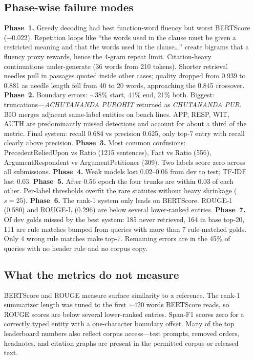 \documentclass[11pt, oneside]{article}
\begin{document}
\subsection{Phase-wise failure modes}
\textbf{Phase~1.} Greedy decoding had best function-word fluency but worst BERTScore ($-0.022$).
Repetition loops like ``the words used in the clause must be given a restricted meaning and that the
words used in the clause\ldots'' create bigrams that a fluency proxy rewards, hence the 4-gram repeat
limit. Citation-heavy continuations under-generate (36 words from 210 tokens). Shorter retrieval needles
pull in passages quoted inside other cases; quality dropped from 0.939 to 0.881 as needle length fell
from 40 to 20 words, approaching the 0.845 crossover.
\textbf{Phase~2.} Boundary errors: $\sim$38\% start, 41\% end, 21\% both. Biggest: truncations---\emph{ACHUTANANDA
PUROHIT} returned as \emph{CHUTANANDA PUR}. BIO merges adjacent same-label entities on bench lines. APP,
RESP, WIT, AUTH are predominantly missed detections and account for about a third of the metric. Final
system: recall 0.684 vs precision 0.625, only top-7 entry with recall clearly above precision.
\textbf{Phase~3.} Most common confusions: PrecedentReliedUpon vs Ratio (1215 sentences), Fact vs Ratio
(556), ArgumentRespondent vs ArgumentPetitioner (309). Two labels score zero across all submissions.
\textbf{Phase~4.} Weak models lost 0.02--0.06 from dev to test; TF-IDF lost 0.03.
\textbf{Phase~5.} After 0.56 epoch the four trunks are within 0.03 of each other. Per-label thresholds
overfit the rare statutes without heavy shrinkage ($s=25$).
\textbf{Phase~6.} The rank-1 system only leads on BERTScore. ROUGE-1 (0.580) and ROUGE-L (0.296) are
below several lower-ranked entries.
\textbf{Phase~7.} Of dev golds missed by the best system: 185 never retrieved, 164 in base top-20, 111
are rule matches bumped from queries with more than 7 rule-matched golds. Only 4 wrong rule matches make
top-7. Remaining errors are in the 45\% of queries with no header rule and no corpus copy.

\subsection{What the metrics do not measure}
BERTScore and ROUGE measure surface similarity to a reference. The rank-1 summarizer length was tuned to
the first $\sim$420 words BERTScore reads, so ROUGE scores are below several lower-ranked entries.
Span-F1 scores zero for a correctly typed entity with a one-character boundary offset. Many of the top
leaderboard numbers also reflect corpus access---test prompts, removed orders, headnotes, and citation
graphs are present in the permitted corpus or released text.
\end{document}
